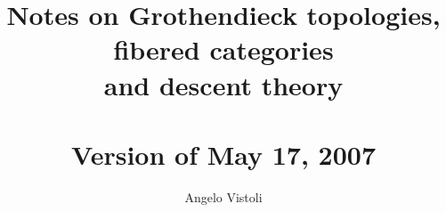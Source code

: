 \documentclass[10pt, openany]{amsbook}
\numberwithin{equation}{section}
\numberwithin{subsection}{section}
\numberwithin{section}{chapter}
\theoremstyle{definition}
\theoremstyle{remark}
\begin{document}
\title{Notes on Grothendieck topologies,\\
fibered categories\\
and descent theory\\\ \\{\rm\small Version of May 17, 2007}}

\author[Angelo Vistoli]{Angelo Vistoli}

\address{Scuola Normale Superiore\\Piazza dei Cavalieri 7\\
56126\\Pisa\\Italy}


\begin{FRONTMATTER}
\maketitle

\tableofcontents
\end{FRONTMATTER}



\begin{ENDMATTER}



\printindex
\end{ENDMATTER}
\end{document}
